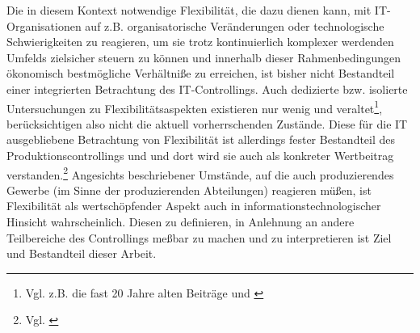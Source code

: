 Die in diesem Kontext notwendige Flexibilit\"at, die dazu dienen kann, mit IT-Organisationen auf z.B. organisatorische Ver\"anderungen oder technologische Schwierigkeiten zu reagieren, um sie trotz kontinuierlich komplexer werdenden Umfelds zielsicher steuern zu k\"onnen und innerhalb dieser Rahmenbedingungen \"okonomisch bestm\"ogliche Verh\"altni{\ss}e zu erreichen, ist bisher nicht Bestandteil einer integrierten Betrachtung des IT-Controllings.\newline
Auch dedizierte bzw. isolierte Untersuchungen zu Flexibilit\"atsaspekten existieren nur wenig und veraltet\footnote{Vgl. z.B. die fast 20 Jahre alten Beitr\"age \cite[S.168ff]{byrdturner2000} und \cite[S.21ff]{byrdturner2001}}, ber\"ucksichtigen also nicht die aktuell vorherrschenden Zust\"ande.
Diese f\"ur die IT ausgebliebene Betrachtung von Flexibilit\"at ist allerdings fester Bestandteil des Produktionscontrollings und und dort wird sie auch als konkreter Wertbeitrag verstanden.\footnote{Vgl. \cite[S.8f]{Gottmann2019}}
Angesichts beschriebener Umst\"ande, auf die auch produzierendes Gewerbe (im Sinne der produzierenden Abteilungen) reagieren m\"u{\ss}en, ist Flexibilit\"at als wertsch\"opfender Aspekt auch in informationstechnologischer Hinsicht wahrscheinlich.
Diesen zu definieren, in Anlehnung an andere Teilbereiche des Controllings me{\ss}bar zu machen und zu interpretieren ist Ziel und Bestandteil dieser Arbeit.

